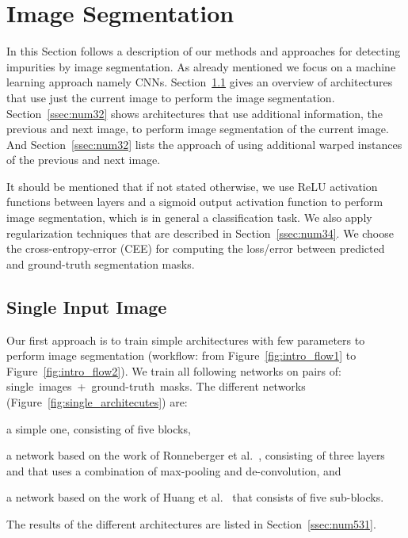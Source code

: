 \section{Image Segmentation}
\label{sec:num3}

In this Section follows a description of our methods and approaches for detecting impurities by image segmentation. As already mentioned we focus on a machine learning approach namely CNNs. Section~\ref{ssec:num31} gives an overview of architectures that use just the current image to perform the image segmentation. Section~\ref{ssec:num32} shows architectures that use additional information, the previous and next image, to perform image segmentation of the current image. And Section~\ref{ssec:num32} lists the approach of using additional warped instances of the previous and next image.

It should be mentioned that if not stated otherwise, we use ReLU activation functions between layers and a sigmoid output activation function to perform image segmentation, which is in general a classification task.  We also apply regularization techniques that are described in Section~\ref{ssec:num34}. We choose the cross-entropy-error (CEE) for computing the loss/error between predicted and ground-truth segmentation masks.


\subsection{Single Input Image}
\label{ssec:num31}

Our first approach is to train simple architectures with few parameters to perform image segmentation (workflow: from Figure~\ref{fig:intro_flow1} to Figure~\ref{fig:intro_flow2}). We train all following networks on pairs of: single~images~+~ground-truth~masks. The different networks (Figure~\ref{fig:single_architecutes}) are: \begin{enumerate*}[label=(\alph*)]\item a simple one, consisting of five blocks, \item a network based on the work of Ronneberger et al.~\cite{Ronneberger15}, consisting of three layers and that uses a combination of max-pooling and de-convolution, and \item a network based on the work of Huang et al.~\cite{Huang16} that consists of five sub-blocks.\end{enumerate*}
The results of the different architectures are listed in Section~\ref{ssec:num531}.

